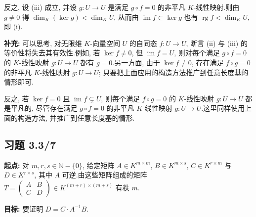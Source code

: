 反之, 设 (iii) 成立, 并设 $g \colon U \longrightarrow U$ 是满足 $g \circ f = 0$ 的非平凡
$K$-线性映射.则由 $g \neq 0$ 得 $\dim_K(\ker g) < \dim_K U$, 从而由
$\operatorname{im} f \subset \ker g$ 也有 $\operatorname{rg} f < \dim_K U$, 即 (i).

\noindent\textbf{补充:} 可以思考, 对无限维 $K$-向量空间 $U$ 的自同态 $f \colon U \longrightarrow U$,
断言 (ii) 与 (iii) 的等价性将失去其有效性.例如, 若 $\ker f \neq 0$, 但 $\operatorname{im} f = U$,
则对每个满足 $g \circ f = 0$ 的 $K$-线性映射 $g \colon U \longrightarrow U$ 都有 $g = 0$.另一方面,
由于 $\ker f \neq 0$, 存在满足 $f \circ g = 0$ 的非平凡 $K$-线性映射 $g \colon U \longrightarrow U$;
只要把上面应用的构造方法推广到任意长度基的情形即可.

反之, 若 $\ker f = 0$ 且 $\operatorname{im} f \subsetneq U$, 则每个满足 $f \circ g = 0$ 的
$K$-线性映射 $g \colon U \longrightarrow U$ 都是平凡的, 尽管存在满足 $g \circ f = 0$ 的非平凡
$K$-线性映射 $g \colon U \longrightarrow U$.这里同样使用上面的构造方法, 并推广到任意长度基的情形.

\subsection*{习题 3.3/7}

\noindent\textbf{起点:} 对 $m, r, s \in \mathbb{N} - \{0\}$, 给定矩阵
$A \in K^{m \times m}$, $B \in K^{m \times s}$, $C \in K^{r \times m}$ 与
$D \in K^{r \times s}$, 其中 $A$ 可逆.由这些矩阵组成的矩阵
$T = \begin{pmatrix} A & B \\ C & D \end{pmatrix} \in K^{(m + r) \times (m + s)}$ 有秩 $m$.

\noindent\textbf{目标:} 要证明 $D = C \cdot A^{-1}B$.

